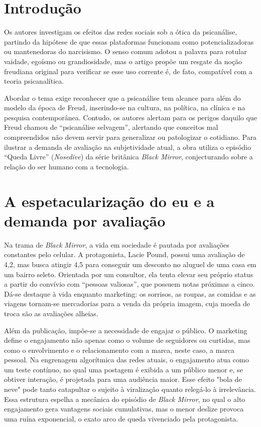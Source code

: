 \documentclass[12pt, a4paper, oneside]{abntex2}
\begin{document}
\chapter{Introdução}
Os autores investigam os efeitos das redes sociais sob a ótica da psicanálise\nocite{pizzimenti2019}, partindo da hipótese de que essas plataformas funcionam como potencializadoras ou mantenedoras do narcisismo. O senso comum adotou a palavra para rotular vaidade, egoísmo ou grandiosidade, mas o artigo propõe um resgate da noção freudiana original para verificar se esse uso corrente é, de fato, compatível com a teoria psicanalítica.

Abordar o tema exige reconhecer que a psicanálise tem alcance para além do modelo da época de Freud, inserindo-se na cultura, na política, na clínica e na pesquisa contemporânea. Contudo, os autores alertam para os perigos daquilo que Freud chamou de ``psicanálise selvagem'', alertando que conceitos mal compreendidos não devem servir para generalizar ou patologizar o cotidiano. Para ilustrar a demanda de avaliação na subjetividade atual, a obra utiliza o episódio ``Queda Livre'' (\textit{Nosedive}) da série britânica \textit{Black Mirror}, conjecturando sobre a relação do ser humano com a tecnologia.

\chapter{A espetacularização do eu e a demanda por avaliação}
Na trama de \textit{Black Mirror}, a vida em sociedade é pautada por avaliações constantes pelo celular. A protagonista, Lacie Pound, possui uma avaliação de 4,2, mas busca atingir 4,5 para conseguir um desconto no aluguel de uma casa em um bairro seleto. Orientada por um consultor, ela tenta elevar seu próprio status a partir do convívio com ``pessoas valiosas'', que possuem notas próximas a cinco. Dá-se destaque à vida enquanto marketing: os sorrisos, as roupas, as comidas e as viagens tornam-se mercadorias para a venda da própria imagem, cuja moeda de troca são as avaliações alheias.

Além da publicação, impõe-se a necessidade de engajar o público. O marketing define o engajamento não apenas como o volume de seguidores ou curtidas, mas como o envolvimento e o relacionamento com a marca, neste caso, a marca pessoal. Na engrenagem algorítmica das redes atuais, o engajamento atua como um teste contínuo, no qual uma postagem é exibida a um público menor e, se obtiver interação, é projetada para uma audiência maior. Esse efeito "bola de neve" pode tanto catapultar o sujeito à viralização quanto relegá-lo à irrelevância. Essa estrutura espelha a mecânica do episódio de \textit{Black Mirror}, no qual o alto engajamento gera vantagens sociais cumulativas, mas o menor deslize provoca uma ruína exponencial, o exato arco de queda vivenciado pela protagonista.
\end{document}
